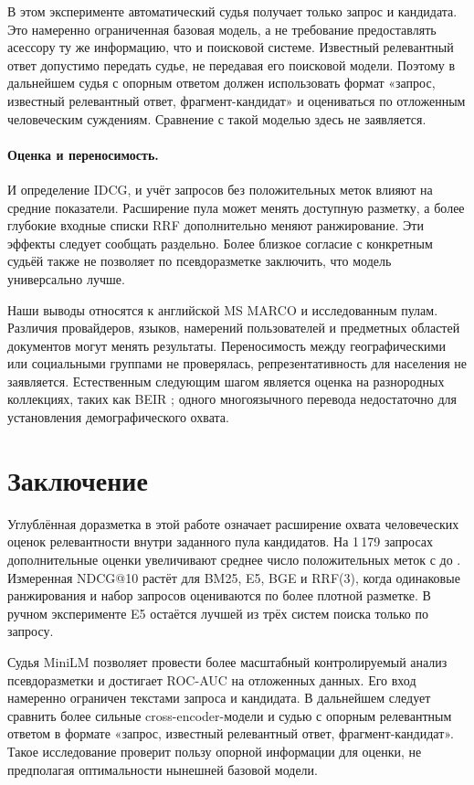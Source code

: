 \documentclass[runningheads,a4paper]{llncs}
\begin{document}
В этом эксперименте автоматический судья получает только запрос и кандидата. Это намеренно ограниченная базовая модель, а не требование предоставлять асессору ту же информацию, что и поисковой системе. Известный релевантный ответ допустимо передать судье, не передавая его поисковой модели. Поэтому в дальнейшем судья с опорным ответом должен использовать формат «запрос, известный релевантный ответ, фрагмент-кандидат» и оцениваться по отложенным человеческим суждениям. Сравнение с такой моделью здесь не заявляется.

\paragraph{Оценка и переносимость.}
И определение IDCG, и учёт запросов без положительных меток влияют на средние показатели. Расширение пула может менять доступную разметку, а более глубокие входные списки RRF дополнительно меняют ранжирование. Эти эффекты следует сообщать раздельно. Более близкое согласие с конкретным судьёй также не позволяет по псевдоразметке заключить, что модель универсально лучше.

Наши выводы относятся к английской MS MARCO и исследованным пулам. Различия провайдеров, языков, намерений пользователей и предметных областей документов могут менять результаты. Переносимость между географическими или социальными группами не проверялась, репрезентативность для населения не заявляется. Естественным следующим шагом является оценка на разнородных коллекциях, таких как BEIR \cite{thakur2021beir}; одного многоязычного перевода недостаточно для установления демографического охвата.

\section{Заключение}
\label{sec:conclusion}

Углублённая доразметка в этой работе означает расширение охвата человеческих оценок релевантности внутри заданного пула кандидатов. На 1\,179 запросах дополнительные оценки увеличивают среднее число положительных меток с \OriginalMeanRel{} до \HumanMeanRel{}. Измеренная NDCG@10 растёт для BM25, E5, BGE и RRF(3), когда одинаковые ранжирования и набор запросов оцениваются по более плотной разметке. В ручном эксперименте E5 остаётся лучшей из трёх систем поиска только по запросу.

Судья MiniLM позволяет провести более масштабный контролируемый анализ псевдоразметки и достигает ROC-AUC \JudgeTestAuc{} на отложенных данных. Его вход намеренно ограничен текстами запроса и кандидата. В дальнейшем следует сравнить более сильные cross-encoder-модели и судью с опорным релевантным ответом в формате «запрос, известный релевантный ответ, фрагмент-кандидат». Такое исследование проверит пользу опорной информации для оценки, не предполагая оптимальности нынешней базовой модели.
\end{document}
